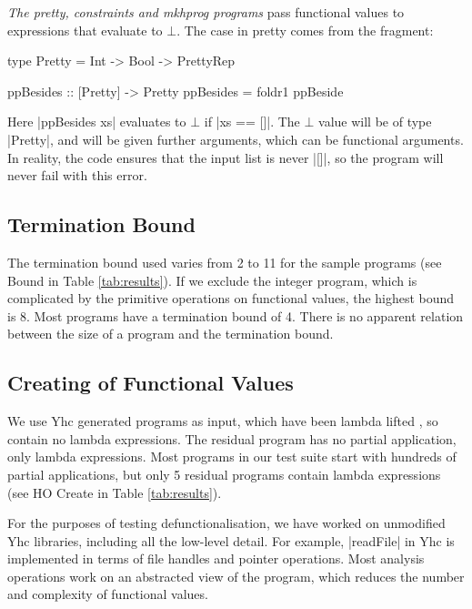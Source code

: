 \documentclass[preprint]{sigplanconf}
\begin{document}
\begin{example}
\textit{The pretty, constraints and mkhprog programs} pass functional values to expressions that evaluate to $\bot$. The case in pretty comes from the fragment:

\begin{comment}
\begin{code}
data PrettyRep = PrettyRep
ppBeside :: Pretty -> Pretty -> Pretty
\end{code}
\end{comment}
\begin{code}
type Pretty = Int -> Bool -> PrettyRep

ppBesides :: [Pretty] -> Pretty
ppBesides = foldr1 ppBeside
\end{code}

Here |ppBesides xs| evaluates to $\bot$ if |xs == []|. The $\bot$ value will be of type |Pretty|, and will be given further arguments, which can be functional arguments. In reality, the code ensures that the input list is never |[]|, so the program will never fail with this error.
\end{example}

\subsection{Termination Bound}

The termination bound used varies from 2 to 11 for the sample programs (see Bound in Table \ref{tab:results}). If we exclude the integer program, which is complicated by the primitive operations on functional values, the highest bound is 8. Most programs have a termination bound of 4. There is no apparent relation between the size of a program and the termination bound.

\subsection{Creating of Functional Values}

We use Yhc generated programs as input, which have been lambda lifted \cite{lambda_lift}, so contain no lambda expressions. The residual program has no partial application, only lambda expressions. Most programs in our test suite start with hundreds of partial applications, but only 5 residual programs contain lambda expressions (see HO Create in Table \ref{tab:results}).

For the purposes of testing defunctionalisation, we have worked on unmodified Yhc libraries, including all the low-level detail. For example, |readFile| in Yhc is implemented in terms of file handles and pointer operations. Most analysis operations work on an abstracted view of the program, which reduces the number and complexity of functional values.
\end{document}
